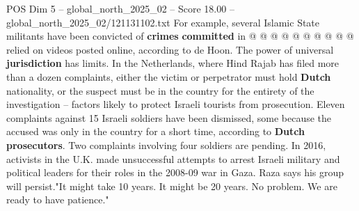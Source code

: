 \begin{textsample}{POS Dim 5 – global\_north\_2025\_02 – Score 18.00 – global\_north\_2025\_02/121131102.txt}
For example, several Islamic State militants have been convicted of \textbf{crimes} \textbf{committed} in @ @ @ @ @ @ @ @ @ @ relied on videos posted online, according to de Hoon.
The power of universal \textbf{jurisdiction} has limits.
In the Netherlands, where Hind Rajab has filed more than a dozen complaints, either the victim or perpetrator must hold \textbf{Dutch} nationality, or the suspect must be in the country for the entirety of the investigation -- factors likely to protect Israeli tourists from prosecution.
Eleven complaints against 15 Israeli soldiers have been dismissed, some because the accused was only in the country for a short time, according to \textbf{Dutch} \textbf{prosecutors}.
Two complaints involving four soldiers are pending.
In 2016, activists in the U.K. made unsuccessful attempts to arrest Israeli military and political leaders for their roles in the 2008-09 war in Gaza.
Raza says his group will persist."It might take 10 years.
It might be 20 years.
No problem.
We are ready to have patience."

\end{textsample}

